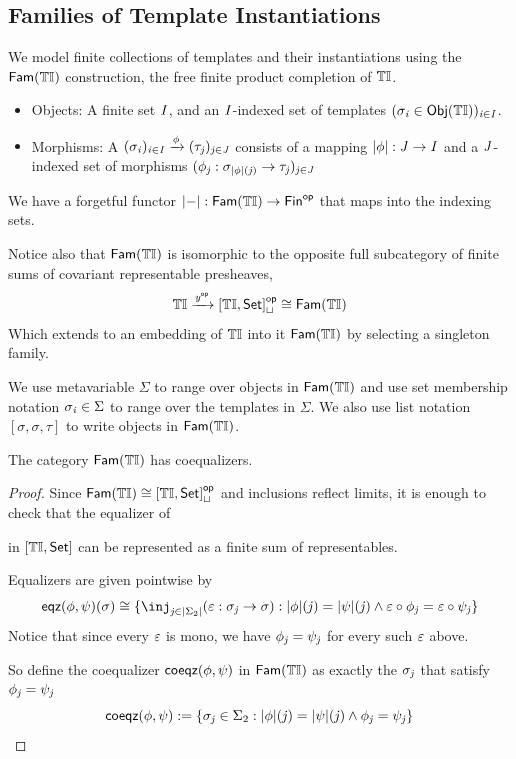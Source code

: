 
\subsection{Families of Template Instantiations}\label{sec:famC-tinstC}

We model finite collections of templates and their instantiations using the $\mathsf{Fam}({{\mathbb{T}\mathbb{I}}})$ construction, the free finite product completion of ${\mathbb{T}\mathbb{I}}$.

\begin{itemize}
    \item Objects: A finite set $\mathit{I}$, and an $\mathit{I}$-indexed set of templates $(\sigma_{\mathit{i}} \in \mathsf{Obj}({{\mathbb{T}\mathbb{I}}}))_{\mathit{i} \in \mathit{I}}$.
    \item Morphisms: A $(\sigma_{\mathit{i}})_{\mathit{i} \in \mathit{I}} \xrightarrow\phi (\tau_{\mathit{j}})_{\mathit{j} \in \mathit{J}}$ consists of
                     a mapping $|{\phi}| : \mathit{J} \to \mathit{I}$ and a $\mathit{J}$-indexed set of morphisms $(\phi_{\mathit{j}} : \sigma_{|{\phi}|(\mathit{j})} \to \tau_{\mathit{j}})_{\mathit{j} \in \mathit{J}}$
\end{itemize}
We have a forgetful functor $|{-}| : \mathsf{Fam}({{\mathbb{T}\mathbb{I}}}) \to {\mathsf{Fin}}^{\mathsf{op}}$ that maps into the indexing sets.

Notice also that $\mathsf{Fam}({{\mathbb{T}\mathbb{I}}})$ is isomorphic to the opposite full subcategory of finite sums of covariant representable presheaves, 
\[ {\mathbb{T}\mathbb{I}} \xrightarrow{{\mathit{y}}^{\mathsf{op}}} {[{\mathbb{T}\mathbb{I}}, \mathsf{Set}]}^{\mathsf{op}}_\sqcup \cong \mathsf{Fam}({{\mathbb{T}\mathbb{I}}}) \]
Which extends to an embedding of ${\mathbb{T}\mathbb{I}}$ into it $\mathsf{Fam}({{\mathbb{T}\mathbb{I}}})$ by selecting a singleton family.

\begin{notation}
We use metavariable $\Sigma$ to range over objects in $\mathsf{Fam}({{\mathbb{T}\mathbb{I}}})$ and use
set membership notation $\sigma_{\mathit{i}} \in \Sigma$ to range over the templates in $\Sigma$.
We also use list notation $[ \sigma, \sigma, \tau ]$ to write objects in $\mathsf{Fam}({{\mathbb{T}\mathbb{I}}})$.
\end{notation}

\begin{lemma}
    The category $\mathsf{Fam}({{\mathbb{T}\mathbb{I}}})$ has coequalizers.
\end{lemma}
\begin{proof}
    Since $\mathsf{Fam}({{\mathbb{T}\mathbb{I}}}) \cong {[{\mathbb{T}\mathbb{I}}, \mathsf{Set}]}^{\mathsf{op}}_\sqcup$ and inclusions reflect limits, 
    it is enough to check that
    the equalizer of  in $[{\mathbb{T}\mathbb{I}}, \mathsf{Set}]$
    can be represented as a finite sum of representables.

    Equalizers are given pointwise by
    \[ \eqz\phi\psi(\sigma) \iso \{ \inj_{\vj \in \indF{\Sigma_2}} (\me : \sigma_\vj \to \sigma) : \indF\phi(\vj) = \indF\psi(\vj) \Land \me \comp \phi_\vj = \me \comp \psi_\vj \} \]
    Notice that since every $\varepsilon$ is mono, we have $\phi_{\mathit{j}} = \psi_{\mathit{j}}$ for every such $\varepsilon$ above.

    So define the coequalizer $\mathsf{coeqz}(\phi, \psi)$ in $\mathsf{Fam}({{\mathbb{T}\mathbb{I}}})$   
    as exactly the $\sigma_{\mathit{j}}$ that satisfy $\phi_{\mathit{j}} = \psi_{\mathit{j}}$
    \[ \mathsf{coeqz}(\phi, \psi) := \{ \sigma_{\mathit{j}} \in \Sigma_2 : |{\phi}|(\mathit{j}) = |{\psi}|(\mathit{j}) \wedge \phi_{\mathit{j}} = \psi_{\mathit{j}} \} \] 
\end{proof}

